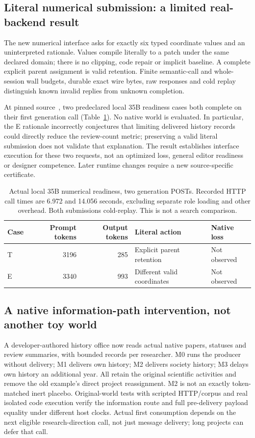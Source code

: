\subsection{Literal numerical submission: a limited real-backend result}
The new numerical interface asks for exactly six typed coordinate values and
an uninterpreted rationale. Values compile literally to a patch under the same
declared domain; there is no clipping, code repair or implicit baseline. A
complete explicit parent assignment is valid retention. Finite semantic-call
and whole-session wall budgets, durable exact wire bytes, raw responses and
cold replay distinguish known invalid replies from unknown completion.

At pinned source~, two predeclared local 35B readiness cases both
complete on their first generation call (Table~\ref{tab:numeric-readiness}).
No native world is evaluated. In particular, the E rationale incorrectly
conjectures that limiting delivered history records could directly reduce the
review-count metric; preserving a valid literal submission does not validate
that explanation. The result establishes interface execution for these two
requests, not an optimized loss, general editor readiness or designer competence.
Later runtime changes require a new source-specific certificate.

\begin{table}[t]
\centering\small
\begin{tabular}{@{}lrrll@{}}
\toprule
Case & Prompt tokens & Output tokens & Literal action & Native loss\\
\midrule
T &3196&285&Explicit parent retention&Not observed\\
E &3340&993&Different valid coordinates&Not observed\\
\bottomrule
\end{tabular}
\caption{Actual local 35B numerical readiness, two generation POSTs. Recorded
HTTP call times are 6.972 and 14.056 seconds, excluding separate role loading and
other overhead. Both submissions cold-replay. This is not a search comparison.}
\label{tab:numeric-readiness}
\end{table}

\subsection{A native information-path intervention, not another toy world}
A developer-authored history office now reads actual native papers, statuses
and review summaries, with bounded records per researcher. M0 runs the
producer without delivery; M1 delivers own history; M2 delivers society
history; M3 delays own history an additional year. All retain the original
scientific activities and remove the old example's direct project reassignment.
M2 is not an exactly token-matched inert placebo. Original-world tests with
scripted HTTP/corpus and real isolated code execution verify the information
route and full pre-delivery payload equality under different host clocks.
Actual first consumption depends on the next eligible research-direction call,
not just message delivery; long projects can defer that call.


